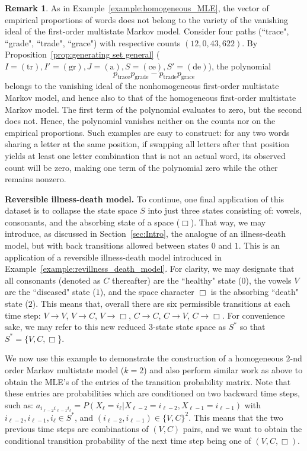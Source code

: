 \documentclass[11pt, a4paper]{article}
\numberwithin{equation}{section}
\theoremstyle{plain}
\theoremstyle{definition}
\newtheorem{remark}[theorem]{Remark}
\begin{document}
\begin{remark}
As in Example~\ref{example:homogeneous_MLE}, the vector of empirical proportions of words does not belong to the variety of the vanishing ideal of the first-order multistate Markov model. Consider four paths (``trace", ``grade", ``trade", ``grace") with respective counts $(12, 0, 43, 622)$. By Proposition~\ref{prop:generating set general} ($I = (\text{tr}), I' = (\text{gr}), J = (\text{a}), S = (\text{ce}), S' = (\text{de})$), the polynomial
\[
p_{\text{trace}}p_{\text{grade}}-p_{\text{trade}}p_{\text{grace}}
\]
belongs to the vanishing ideal of the nonhomogeneous first-order multistate Markov model, and hence also to that of the homogeneous first-order multistate Markov model.  
The first term of the polynomial evaluates to zero, but the second does not. Hence, the polynomial vanishes neither on the counts nor on the empirical proportions. Such examples are easy to construct: for any two words sharing a letter at the same position, if swapping all letters after that position yields at least one letter combination that is not an actual word, its observed count will be zero, making one term of the polynomial zero while the other remains nonzero.
\end{remark}


\textbf{Reversible illness-death model.} To continue, one final application of this dataset is to collapse the state space $S$ into just three states consisting of: vowels, consonants, and the absorbing state of a space ($\mathcal\Box$). That way, we may introduce, as discussed in Section~\ref{sec:Intro}, the analogue of an illness-death model, but with back transitions allowed between states $0$ and $1$. This is an  application  of a reversible illness-death model introduced in Example~\ref{example:revillness_death_model}. For clarity, we may designate that all consonants (denoted as $C$ thereafter) are the ``healthy" state ($0$), the vowels $V$ are the ``diseased" state ($1$), and the space character $\mathcal\Box$ is the absorbing ``death" state ($2$). This means that, overall there are six permissible transitions at each time step: $V\rightarrow V$, $V\rightarrow C$, $V\rightarrow \mathcal\Box$, $C\rightarrow C$, $C\rightarrow V$, $C \rightarrow \mathcal{\Box}.$ For convenience sake, we may refer to this new reduced 3-state state space as $S^*$ so that $S^{*}=\{V,C,\mathcal{\Box}$\}.

We now use this example to demonstrate the construction of a homogeneous $2$-nd order  Markov multistate model ($k=2$) and also perform similar work as above to obtain the MLE's of the entries of the transition probability matrix. Note that these entries are probabilities which are conditioned on two backward time steps, such as: $a_{i_{\ell-2} i_{\ell-1} i_\ell}= P(X_\ell = i_\ell | X_{\ell-2}=i_{\ell-2},X_{\ell-1}=i_{\ell-1})$ with $i_{\ell-2}, i_{\ell-1}, i_{\ell} \in S^{*}$, and $(i_{\ell-2}, i_{\ell-1})\in \{V,C\}^{2}$. This means that the two previous time steps are combinations of $(V,C)$ pairs, and we want to obtain the conditional transition probability of the next time step being one of $(V,C,\mathcal\Box).$ 
\end{document}
